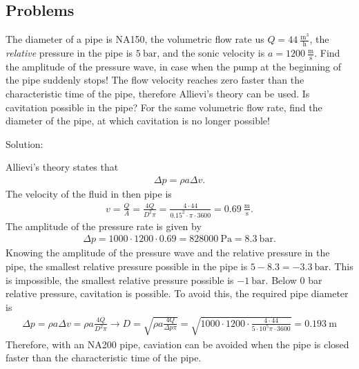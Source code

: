 \subsection{Problems}



\vspace{1cm}

The diameter of a pipe is NA150, the volumetric flow rate us $Q=44~\frac{\mathrm{m^3}}{\mathrm{h}}$, the \emph{relative} pressure in the pipe is $5~\mathrm{bar}$, and the sonic velocity is $a=1200~\frac{\mathrm{m}}{\mathrm{s}}$. Find the amplitude of the pressure wave, in case when the pump at the beginning of the pipe suddenly stops! The flow velocity reaches zero faster than the characteristic time of the pipe, therefore Allievi's theory can be used. Is cavitation possible in the pipe? For the same volumetric flow rate, find the diameter of the pipe, at which cavitation is no longer possible!

Solution:

Allievi's theory states that
\begin{align*}
\Delta p = \rho a \Delta v.
\end{align*}
The velocity of the fluid in then pipe is
\begin{align*}
v = \frac{Q}{A} = \frac{4Q}{D^2 \pi} = \frac{4\cdot 44}{0.15^2 \cdot \pi \cdot 3600} = 0.69~\frac{\mathrm{m}}{\mathrm{s}}.
\end{align*}
The amplitude of the pressure rate is given by
\begin{align*}
\Delta p = 1000 \cdot 1200 \cdot 0.69 = 828 000 ~\mathrm{Pa} = 8.3~\mathrm{bar}.
\end{align*}
Knowing the amplitude of the pressure wave and the relative pressure in the pipe, the smallest relative pressure possible in the pipe is $5-8.3 = -3.3~\mathrm{bar}$. This is impossible, the smallest relative pressure possible is $-1~\mathrm{bar}$. Below 0 bar relative pressure, cavitation is possible. To avoid this, the required pipe diameter is
\begin{align*}
\Delta p = \rho a \Delta v = \rho a \frac{4Q}{D^2 \pi} \rightarrow D = \sqrt{\rho a \frac{4Q}{\Delta p \pi}} = \sqrt{1000 \cdot 1200 \cdot \frac{4\cdot 44}{5 \cdot 10^5 \pi \cdot 3600}} = 0.193~\mathrm{m}
\end{align*}
Therefore, with an NA200 pipe, caviation can be avoided when the pipe is closed faster than the characteristic time of the pipe.


